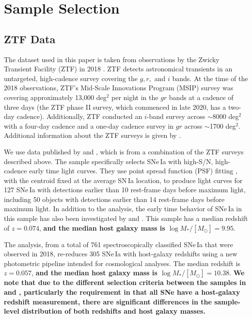 \documentclass[twocolumn,twocolappendix, linenumbers]{aastex631} %
\begin{document}
\section{Sample Selection} \label{data}
\subsection{ZTF Data}
The dataset used in this paper is taken from observations by the Zwicky Transient Facility (ZTF) in 2018 \citep{Bellm19,Masci19}.
ZTF detects astronomical transients in an untargeted, high-cadence survey covering the $g, r,$ and $i$ bands. At the time of the 2018 observations, ZTF's Mid-Scale Innovations Program (MSIP) survey was covering approximately 13,000 deg$^2$ per night in the $gr$ bands at a cadence of three days (the ZTF phase II survey, which commenced in late 2020, has a two-day cadence).  Additionally, ZTF conducted an $i$-band survey across $\sim$8000 deg$^2$ with a four-day cadence and a one-day cadence survey in $gr$ across $\sim$1700 deg$^2$.  Additional information about the ZTF surveys is given by \citet{Bellm19}. 

We use data published by \citet{Yao19} and \citet{Dhawan22}, which is from a combination of the ZTF surveys described above.  The \citet{Yao19} sample specifically selects SNe\,Ia with high-S/N, high-cadence early time light curves.  They use point spread function (PSF) fitting \citep{Masci19}, with the centroid fixed at the average SN\,Ia location, to produce light curves for 127 SNe\,Ia with detections earlier than 10 rest-frame days before maximum light, including 50 objects with detections earlier than 14 rest-frame days before maximum light.  In addition to the \citet{Yao19} analysis, the early time behavior of SNe\,Ia in this sample has also been investigated by \citet{Burke22a} and \citet{Deckers22}.  This sample has a median redshift of $z = 0.074$, {\bf and the median host galaxy mass is $\log M_{*}/[M_\odot] = 9.95$}.   

The \citet{Dhawan22} analysis, from a total of 761 spectroscopically classified SNe\,Ia that were observed in 2018, re-reduces 305 SNe\,Ia with host-galaxy redshifts using a new photometric pipeline intended for cosmological analyses. The median redshift is $z = 0.057$, {\bf and the median host galaxy mass is $\log M_{*}/[M_\odot] = 10.38$}. {\bf We note that due to the different selection criteria between the samples in \citet{Yao19} and \citet{Dhawan22}, particularly the requirement in \citet{Dhawan22} that all SNe have a host-galaxy redshift measurement, there are significant differences in the sample-level distribution of both redshifts and host galaxy masses.}
\end{document}
